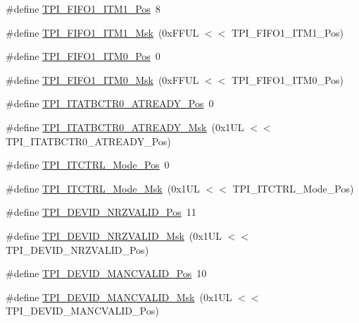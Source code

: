 \begin{DoxyCompactItemize}
\item 
\#define \hyperlink{group___c_m_s_i_s___t_p_i_gaece86ab513bc3d0e0a9dbd82258af49f}{T\+P\+I\+\_\+\+F\+I\+F\+O1\+\_\+\+I\+T\+M1\+\_\+\+Pos}~8
\item 
\#define \hyperlink{group___c_m_s_i_s___t_p_i_ga3347f42828920dfe56e3130ad319a9e6}{T\+P\+I\+\_\+\+F\+I\+F\+O1\+\_\+\+I\+T\+M1\+\_\+\+Msk}~(0x\+F\+F\+U\+L $<$$<$ T\+P\+I\+\_\+\+F\+I\+F\+O1\+\_\+\+I\+T\+M1\+\_\+\+Pos)
\item 
\#define \hyperlink{group___c_m_s_i_s___t_p_i_ga2188671488417a52abb075bcd4d73440}{T\+P\+I\+\_\+\+F\+I\+F\+O1\+\_\+\+I\+T\+M0\+\_\+\+Pos}~0
\item 
\#define \hyperlink{group___c_m_s_i_s___t_p_i_ga8ae09f544fc1a428797e2a150f14a4c9}{T\+P\+I\+\_\+\+F\+I\+F\+O1\+\_\+\+I\+T\+M0\+\_\+\+Msk}~(0x\+F\+F\+U\+L $<$$<$ T\+P\+I\+\_\+\+F\+I\+F\+O1\+\_\+\+I\+T\+M0\+\_\+\+Pos)
\item 
\#define \hyperlink{group___c_m_s_i_s___t_p_i_gab1eb6866c65f02fa9c83696b49b0f346}{T\+P\+I\+\_\+\+I\+T\+A\+T\+B\+C\+T\+R0\+\_\+\+A\+T\+R\+E\+A\+D\+Y\+\_\+\+Pos}~0
\item 
\#define \hyperlink{group___c_m_s_i_s___t_p_i_gaee320b3c60f9575aa96a8742c4ff9356}{T\+P\+I\+\_\+\+I\+T\+A\+T\+B\+C\+T\+R0\+\_\+\+A\+T\+R\+E\+A\+D\+Y\+\_\+\+Msk}~(0x1\+U\+L $<$$<$ T\+P\+I\+\_\+\+I\+T\+A\+T\+B\+C\+T\+R0\+\_\+\+A\+T\+R\+E\+A\+D\+Y\+\_\+\+Pos)
\item 
\#define \hyperlink{group___c_m_s_i_s___t_p_i_gaa847adb71a1bc811d2e3190528f495f0}{T\+P\+I\+\_\+\+I\+T\+C\+T\+R\+L\+\_\+\+Mode\+\_\+\+Pos}~0
\item 
\#define \hyperlink{group___c_m_s_i_s___t_p_i_gad6f87550b468ad0920d5f405bfd3f017}{T\+P\+I\+\_\+\+I\+T\+C\+T\+R\+L\+\_\+\+Mode\+\_\+\+Msk}~(0x1\+U\+L $<$$<$ T\+P\+I\+\_\+\+I\+T\+C\+T\+R\+L\+\_\+\+Mode\+\_\+\+Pos)
\item 
\#define \hyperlink{group___c_m_s_i_s___t_p_i_ga9f46cf1a1708575f56d6b827766277f4}{T\+P\+I\+\_\+\+D\+E\+V\+I\+D\+\_\+\+N\+R\+Z\+V\+A\+L\+I\+D\+\_\+\+Pos}~11
\item 
\#define \hyperlink{group___c_m_s_i_s___t_p_i_gacecc8710a8f6a23a7d1d4f5674daf02a}{T\+P\+I\+\_\+\+D\+E\+V\+I\+D\+\_\+\+N\+R\+Z\+V\+A\+L\+I\+D\+\_\+\+Msk}~(0x1\+U\+L $<$$<$ T\+P\+I\+\_\+\+D\+E\+V\+I\+D\+\_\+\+N\+R\+Z\+V\+A\+L\+I\+D\+\_\+\+Pos)
\item 
\#define \hyperlink{group___c_m_s_i_s___t_p_i_ga675534579d9e25477bb38970e3ef973c}{T\+P\+I\+\_\+\+D\+E\+V\+I\+D\+\_\+\+M\+A\+N\+C\+V\+A\+L\+I\+D\+\_\+\+Pos}~10
\item 
\#define \hyperlink{group___c_m_s_i_s___t_p_i_ga4c3ee4b1a34ad1960a6b2d6e7e0ff942}{T\+P\+I\+\_\+\+D\+E\+V\+I\+D\+\_\+\+M\+A\+N\+C\+V\+A\+L\+I\+D\+\_\+\+Msk}~(0x1\+U\+L $<$$<$ T\+P\+I\+\_\+\+D\+E\+V\+I\+D\+\_\+\+M\+A\+N\+C\+V\+A\+L\+I\+D\+\_\+\+Pos)

\end{DoxyCompactItemize}
